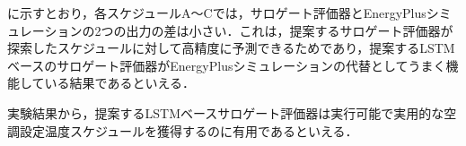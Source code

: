 に示すとおり，各スケジュールA～Cでは，サロゲート評価器とEnergyPlusシミュレーションの2つの出力の差は小さい．これは，提案するサロゲート評価器が探索したスケジュールに対して高精度に予測できるためであり，提案するLSTMベースのサロゲート評価器がEnergyPlusシミュレーションの代替としてうまく機能している結果であるといえる．

実験結果から，提案するLSTMベースサロゲート評価器は実行可能で実用的な空調設定温度スケジュールを獲得するのに有用であるといえる．

